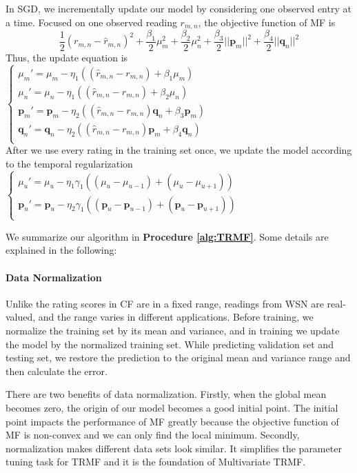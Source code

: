 In SGD, we incrementally update our model by considering one observed entry at a time. Focused on one observed reading $r_{m,n}$, the objective function of MF is
\begin{equation*} \frac{1}{2}(r_{m,n} - \hat{r}_{m,n})^2 + \frac{\beta_1}{2}\mu_m^2 + \frac{\beta_2}{2}\mu_n^2 + \frac{\beta_3}{2}||\mathbf{p}_m||^2 + \frac{\beta_4}{2}||\mathbf{q}_n||^2\end{equation*}
Thus, the update equation is\\
$\begin{cases}
	\mu_m' = \mu_m - \eta_1 ((\hat{r}_{m,n}-r_{m,n}) + \beta_1 \mu_m) \\
	\mu_n' = \mu_n - \eta_1 ((\hat{r}_{m,n}-r_{m,n}) + \beta_2 \mu_n) \\
	\mathbf{p}_{m}' = \mathbf{p}_{m} - \eta_2 ((\hat{r}_{m,n}-r_{m,n})\mathbf{q}_{n} + \beta_3 \mathbf{p}_{m})\\
	\mathbf{q}_{n}' = \mathbf{q}_{n} - \eta_2 ((\hat{r}_{m,n}-r_{m,n})\mathbf{p}_{m} + \beta_4 \mathbf{q}_{n})\\
\end{cases}$\\
After we use every rating in the training set once, we update the model according to the temporal regularization
$\begin{cases}
	\mu_u' = \mu_u - \eta_1 \gamma_1((\mu_u-\mu_{u-1})+(\mu_u-\mu_{u+1}))\\
	\mathbf{p}_{u}' = \mathbf{p}_{u} - \eta_2 \gamma_1((\mathbf{p}_{u}-\mathbf{p}_{u-1})+(\mathbf{p}_{u}-\mathbf{p}_{u+1}))\\
\end{cases}$

We summarize our algorithm in \textbf{Procedure \ref{alg:TRMF}}. Some details are explained in the following:

\paragraph*{Data Normalization}

Unlike the rating scores in CF are in a fixed range, readings from WSN are real-valued, and the range varies in different applications. Before training, we normalize the training set by its mean and variance, and in training we update the model by the normalized training set. While predicting validation set and testing set, we restore the prediction to the original mean and variance range and then calculate the error.

There are two benefits of data normalization. Firstly, when the global mean becomes zero, the origin of our model becomes a good initial point. The initial point impacts the performance of MF greatly because the objective function of MF is non-convex and we can only find the local minimum. Secondly, normalization makes different data sets look similar. It simplifies the parameter tuning task for TRMF and it is the foundation of Multivariate TRMF. 


